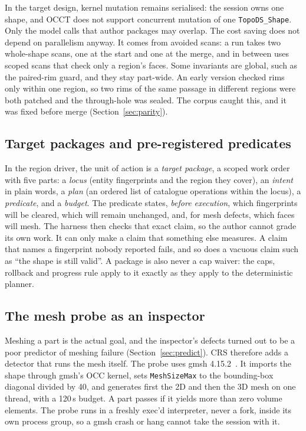 \documentclass[11pt,onecolumn]{article}
\newcommand{\code}[1]{\texttt{\small #1}}
\begin{document}
In the target design, kernel mutation remains serialised: the session owns one shape, and OCCT does
not support concurrent mutation of one \code{TopoDS\_Shape}. Only the model calls that author
packages may overlap. The cost saving does not depend on parallelism anyway. It comes from avoided
scans: a run takes two whole-shape scans, one at the start and one at the merge, and in between uses
scoped scans that check only a region's faces. Some invariants are global, such as the paired-rim
guard, and they stay part-wide. An early version checked rims only within one region, so two rims of
the same passage in different regions were both patched and the through-hole was sealed. The corpus
caught this, and it was fixed before merge (Section~\ref{sec:parity}).

\subsection{Target packages and pre-registered predicates}
In the region driver, the unit of action is a \emph{target package}, a scoped work order with five
parts: a \emph{locus} (entity fingerprints and the region they cover), an \emph{intent} in plain
words, a \emph{plan} (an ordered list of catalogue operations within the locus), a
\emph{predicate}, and a \emph{budget}. The predicate states, \emph{before execution}, which
fingerprints will be cleared, which will remain unchanged, and, for mesh defects, which faces will
mesh. The harness then checks that exact claim, so the author cannot grade its own work. It can only
make a claim that something else measures. A claim that names a fingerprint nobody reported fails,
and so does a vacuous claim such as ``the shape is still valid''. A package is also never a cap
waiver: the caps, rollback and progress rule apply to it exactly as they apply to the deterministic
planner.

\subsection{The mesh probe as an inspector}\label{sec:probe}
Meshing a part is the actual goal, and the inspector's defects turned out to be a poor predictor of
meshing failure (Section~\ref{sec:predict}). CRS therefore adds a detector that runs the mesh
itself. The probe uses gmsh 4.15.2~\cite{gmsh}. It imports the shape through gmsh's OCC kernel, sets
\code{MeshSizeMax} to the bounding-box diagonal divided by 40, and generates first the 2D and then
the 3D mesh on one thread, with a 120\,s budget. A part passes if it yields more than zero volume
elements. The probe runs in a freshly exec'd interpreter, never a fork, inside its own process
group, so a gmsh crash or hang cannot take the session with it.
\end{document}
